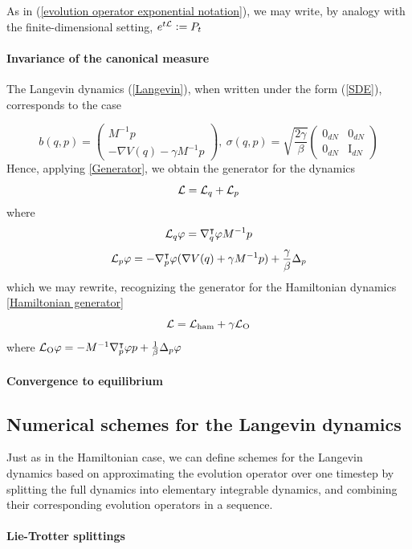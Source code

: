     As in (\ref{evolution operator exponential notation}), we may write, by analogy with the finite-dimensional setting,
    $e^{t\mathcal{L}}\mathrel{\mathop:}= P_t$


    \paragraph{Invariance of the canonical measure}

    The Langevin dynamics (\ref{Langevin}), when written under the form (\ref{SDE}), corresponds to the case 

    $$ b(q,p)= \begin{pmatrix} M^{-1}p \\ -
    \nabla V(q)-\gamma M^{-1}p\end{pmatrix},\ \sigma(q,p)= \sqrt{\frac{2\gamma}\beta}\begin{pmatrix} 0_{dN} &  0_{dN} \\  0_{dN} & \text{I}_{dN} \end{pmatrix}$$
    Hence, applying \ref{Generator}, we obtain the generator for the dynamics
    $$ \mathcal{L}=  \mathcal{L}_q + \mathcal{L}_p $$
    where
    $$ \mathcal{L}_q \varphi= \nabla^\intercal_q\varphi M^{-1}p$$
    $$ \mathcal{L}_p\varphi =-\nabla^\intercal_{p}\varphi (\nabla V(q)+\gamma M^{-1}p) +\frac{\gamma}{\beta}\Delta_p $$
    which we may rewrite, recognizing the generator for the Hamiltonian dynamics \ref{Hamiltonian generator}
    $$ \mathcal{L}=\mathcal{L}_{\mathrm{ham}}+\gamma \mathcal{L}_{\mathrm{O}}$$
    where $\mathcal{L}_{\mathrm{O}}\varphi =-M^{-1}\nabla^\intercal_p\varphi p + \frac1{\beta}\Delta_p\varphi$

    \paragraph{Convergence to equilibrium}
\subsection{Numerical schemes for the Langevin dynamics}
Just as in the Hamiltonian case, we can define schemes for the Langevin dynamics based on approximating the evolution operator over one timestep by splitting the full dynamics into elementary integrable dynamics, and combining their corresponding evolution operators in a sequence.
    \paragraph{Lie-Trotter splittings}


    \begin{example}
    \end{example}
